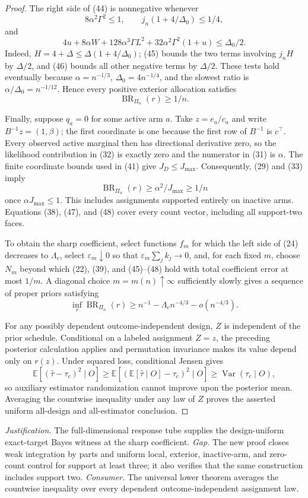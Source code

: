 \documentclass{article}
\begin{document}
\begin{proof}
The right side of (44) is nonnegative whenever
\[
8\alpha^2\Gamma^2\le1,
\qquad
j_n(1+4/\Delta_0)\le1/4,
\tag{45}
\]
and
\[
4u+8\alpha W+128\alpha^3\Gamma L^2
+32\alpha^2\Gamma^2(1+u)\le\Delta_0/2.
\tag{46}
\]
Indeed, \(H=4+\Delta\le\Delta(1+4/\Delta_0)\); (45) bounds the two terms involving \(j_nH\) by \(\Delta/2\), and (46) bounds all other negative terms by \(\Delta/2\).  These tests hold eventually because \(\alpha=n^{-1/3}\), \(\Delta_0=4n^{-1/4}\), and the slowest ratio is \(\alpha/\Delta_0=n^{-1/12}\).  Hence every positive exterior allocation satisfies
\[
\operatorname{BR}_{\Pi_n}(r)\ge1/n.
\tag{47}
\]

Finally, suppose \(q_a=0\) for some active arm \(a\).  Take \(z=e_a/c_a\) and write \(B^{-1}z=(1,\beta)\); the first coordinate is one because the first row of \(B^{-1}\) is \(c^\top\).  Every observed active marginal then has directional derivative zero, so the likelihood contribution in (32) is exactly zero and the numerator in (31) is \(\alpha\).  The finite coordinate bounds used in (41) give \(J_D\le J_{\max}\).  Consequently, (29) and (33) imply
\[
\operatorname{BR}_{\Pi_n}(r)\ge\alpha^2/J_{\max}\ge1/n
\tag{48}
\]
once \(\alpha J_{\max}\le1\).  This includes assignments supported entirely on inactive arms.  Equations (38), (47), and (48) cover every count vector, including all support-two faces.

To obtain the sharp coefficient, select functions \(f_m\) for which the left side of (24) decreases to \(\Lambda_c\), select \(\varepsilon_m\downarrow0\) so that \(\varepsilon_m\sum_jk_j\to0\), and, for each fixed \(m\), choose \(N_m\) beyond which (22), (39), and (45)--(48) hold with total coefficient error at most \(1/m\).  A diagonal choice \(m=m(n)\uparrow\infty\) sufficiently slowly gives a sequence of proper priors satisfying
\[
\inf_r\operatorname{BR}_{\Pi_n}(r)
\ge n^{-1}-\Lambda_cn^{-4/3}-o(n^{-4/3}).
\]

For any possibly dependent outcome-independent design, \(Z\) is independent of the prior schedule.  Conditional on a labeled assignment \(Z=z\), the preceding posterior calculation applies and permutation invariance makes its value depend only on \(r(z)\).  Under squared loss, conditional Jensen gives
\[
\mathbb E[(\widehat\tau-\tau_c)^2\mid O]
\ge\mathbb E[(\mathbb E[\widehat\tau\mid O]-\tau_c)^2\mid O]
\ge\operatorname{Var}(\tau_c\mid O),
\]
so auxiliary estimator randomization cannot improve upon the posterior mean.  Averaging the countwise inequality under any law of \(Z\) proves the asserted uniform all-design and all-estimator conclusion.
\end{proof}
\par\smallskip\noindent \textit{Justification.} The full-dimensional response tube supplies the design-uniform exact-target Bayes witness at the sharp coefficient. \textit{Gap.} The new proof closes weak integration by parts and uniform local, exterior, inactive-arm, and zero-count control for support at least three; it also verifies that the same construction includes support two. \textit{Consumer.} The universal lower theorem averages the countwise inequality over every dependent outcome-independent assignment law.
\end{document}
